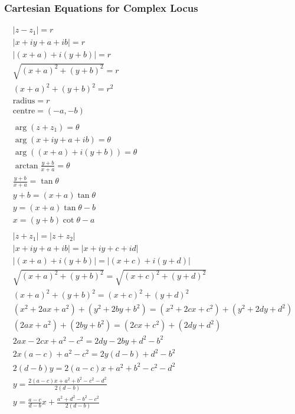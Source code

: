 \documentclass{article}
\begin{document}
\subsubsection{Cartesian Equations for Complex Locus}

\begin{gather}
	|z - z_1| = r \\
	|x + iy +  a + ib| = r \\
	|(x + a) +i(y + b)| = r \\
	\sqrt{(x + a)^2 + (y + b)^2} = r \\
	(x + a)^2 + (y + b)^2 = r^2 \\
	\text{radius} = r \\
	\text{centre} = (-a, -b) \\
	\\
	\arg(z + z_1) = \theta \\
	\arg(x + iy + a + ib) = \theta \\
	\arg((x + a) + i(y + b)) = \theta \\
	\arctan{\frac{y + b}{x + a}} = \theta \\
	\frac{y + b}{x + a} = \tan \theta \\
	y + b = (x + a) \tan \theta \\
	y = (x + a) \tan \theta - b \\
	x = (y + b) \cot \theta - a \\
	\\
	|z + z_1| = |z + z_2| \\
	|x + iy + a + ib| = |x + iy + c + id| \\
	|(x + a) + i(y + b)| = |(x + c) + i (y + d)| \\
	\sqrt{(x + a)^2 + (y + b)^2} = \sqrt{(x + c)^2 + (y + d)^2} \\
	(x + a)^2 + (y + b)^2 = (x + c)^2 + (y + d)^2 \\
	(x^2 + 2ax + a^2) + (y^2 + 2by + b^2) = (x^2 + 2cx + c^2) + (y^2 + 2dy + d^2) \\
	(2ax + a^2) + (2by + b^2) = (2cx + c^2) + (2dy + d^2) \\
	2ax - 2cx + a^2 - c^2 = 2dy - 2by + d^2 - b^2 \\
	2x(a - c) + a^2 - c^2 = 2y(d - b) + d^2 - b^2 \\
	2(d - b)y = 2(a - c)x + a^2 + b^2 - c^2 - d^2 \\
	y = \frac{2(a - c)x + a^2 + b^2 - c^2 - d^2}{2(d - b)} \\
	y = \frac{a - c}{d - b} x + \frac{a^2 + d^2 - b^2 - c^2}{2(d - b)}
\end{gather}
\end{document}

